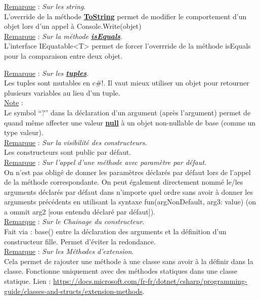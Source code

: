 \documentclass[a4paper,12pt,twoside]{article}
\newcommand{\urlcolor}{magenta}  %
\newcommand{\keycolor}{purple} %
\newcommand{\incode}[1]{{\footnotesize\ttfamily #1}} %
\newcommand{\rem}[2]{\noindent\underline{Remarque} : \textit{#1}.\\ \indent #2}
\newcommand{\note}[1]{\noindent\underline{Note} : \\ \indent #1}
\newcommand{\keyref}[2]{\hypersetup{urlcolor=\keycolor} \href{#1}{\textbf{#2}}\hypersetup{urlcolor=\urlcolor}}
\begin{document}
\rem{Sur les string}{L'override de la méthode \keyref{https://docs.microsoft.com/fr-fr/dotnet/api/system.object.tostring?view=net-6.0}{ToString} permet de modifier le comportement d'un objet lors d'un appel à \incode{Console.Write(objet)}}\\

\rem{Sur la méthode \keyref{https://docs.microsoft.com/en-us/dotnet/api/system.object.equals?view=net-6.0}{isEquals}}{ L'interface \incode{IEquatable<T>} permet de forcer l'overrride de la méthode \incode{isEquals} pour la comparaison entre deux objet.}

\rem{Sur les \keyref{https://docs.microsoft.com/fr-fr/dotnet/csharp/language-reference/builtin-types/value-tuples}{tuples}}{Les tuples sont mutables en c\#!. Il vaut mieux utiliser un objet pour retourner plusieurs variables au lieu d'un tuple.}\\

\note{Le symbol ``?'' dans la déclaration d'un argument (après l'argument) permet de quand même affecter une valeur \keyref{https://docs.microsoft.com/fr-fr/dotnet/csharp/language-reference/keywords/null}{null} à un objet non-nullable de base (comme un type valeur).}\\

\rem{Sur la visibilité des constructeurs}{Les constructeurs sont public par défaut.}\\

\rem{Sur l'appel d'une méthode avec paramètre par défaut}{On n'est pas obligé de donner les paramètres déclarés par défaut lors de l'appel de la méthode correspondante. On peut également directement nommé le/les arguments déclarés par défaut dans n'importe quel ordre sans avoir à donner les arguments précédents en utilisant la syntaxe \incode{fun(argNonDefault, arg3: value)} (on a ommit \incode{arg2} [sous entendu déclaré par défaut]).}\\

\rem{Sur le Chainage du constructeur}{Fait via \incode{: base()} entre la déclaration des arguments et la définition d'un constructeur fille. Permet d'éviter la redondance.} \\

\rem{Sur les Méthodes d'extension}{Cela permet de rajouter une méthode à une classe sans avoir à la définir dans la classe. Fonctionne uniquement avec des méthodes statiques dans une classe statique. Lien : \url{https://docs.microsoft.com/fr-fr/dotnet/csharp/programming-guide/classes-and-structs/extension-methods}.}\\
\end{document}
